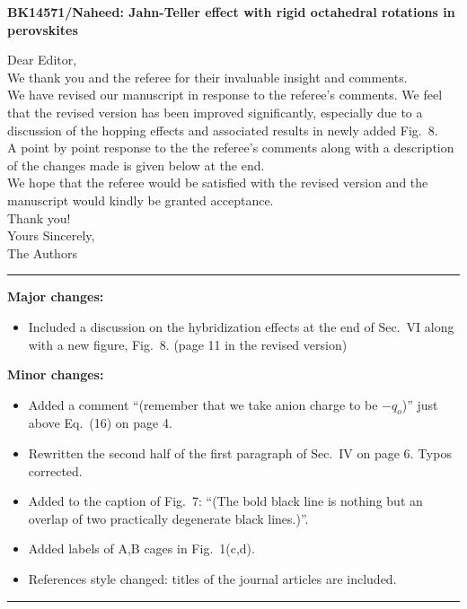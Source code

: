 \documentclass[a4paper,prb]{revtex4-1}  %
\begin{document}
\begin{center}
\textbf{BK14571/Naheed: Jahn-Teller effect with rigid octahedral rotations in perovskites}
\end{center}


Dear Editor,
\\ 

We thank you and the referee for their invaluable insight and comments.
\\

We have revised our manuscript in response to the referee's comments. 
We feel that the revised version has been improved significantly, especially due to a discussion of the hopping effects and associated results in newly added Fig.~8.
\\

A point by point response 
to the the referee's comments
along with a description of the changes made is given below at the end.
\\

We hope that the referee would be satisfied with the revised version and the manuscript would kindly be granted acceptance. 
\\

Thank you!
\\

Yours Sincerely,
\\

The Authors
\\

\rule[1ex]{\textwidth}{.5pt}

\textbf{Major changes:}
\begin{itemize}
\item
Included a discussion on the hybridization effects at the end of Sec.~VI along with a new figure, Fig.~8. (page 11 in the revised version)
\end{itemize}


\textbf{Minor changes:}
\begin{itemize}
\item 
Added a comment ``(remember that we take anion charge to be $-q_o$)''
just above Eq.~(16) on page 4.
\item
Rewritten the second half of the first paragraph 
of Sec.~IV on page 6. Typos corrected.
\item
Added to the caption of Fig.~7:
 ``(The bold black line is nothing but an overlap of two practically degenerate black lines.)''.
 \item
 Added labels of A,B cages in Fig.~1(c,d).
 
 \item 
References style changed: titles of the journal articles are included.
\end{itemize}
\rule[1ex]{\textwidth}{.5pt}
\\
\end{document}
